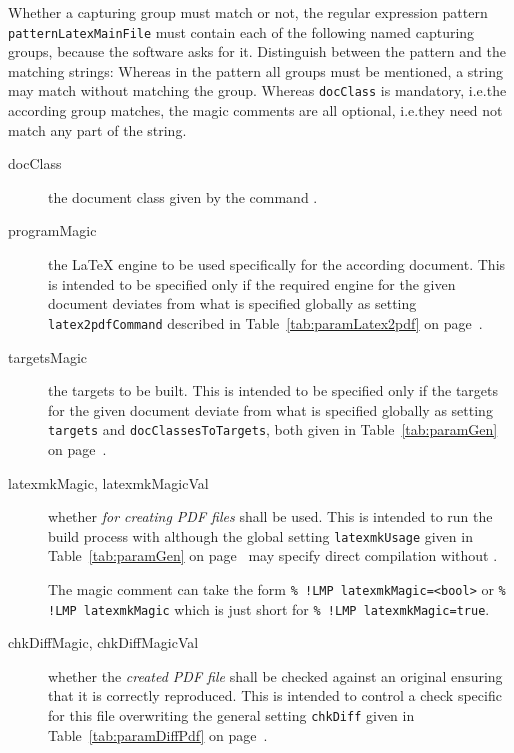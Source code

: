 Whether a capturing group must match or not, 
the regular expression pattern \texttt{patternLatexMainFile} 
must contain each of the following named capturing groups, 
because the software asks for it. 
Distinguish between the pattern and the matching strings: 
Whereas in the pattern all groups must be mentioned, 
a string may match without matching the group. 
Whereas \texttt{docClass} is mandatory, i.e.\@ the according group matches, 
the magic comments are all optional, i.e.\@ they need not match any part of the string. 

\begin{description}
  \item[docClass]
  the document class given by the command . 
  \item[programMagic]
  the \LaTeX{} engine to be used 
  specifically for the according document. 
  This is intended to be specified only 
  if the required engine for the given document deviates 
  from what is specified 
  globally as setting \texttt{latex2pdfCommand} described in 
  Table~\ref{tab:paramLatex2pdf} on page~\pageref{tab:paramLatex2pdf}. 
  \item[targetsMagic]
  the targets to be built. 
  This is intended to be specified only 
  if the targets for the given document deviate from what is specified 
  globally as setting \texttt{targets} and \texttt{docClassesToTargets}, 
  both given in 
  Table~\ref{tab:paramGen} on page~\pageref{tab:paramGen}. 
  \item[latexmkMagic, latexmkMagicVal] 
  whether \emph{for creating PDF files}  shall be used. 
  This is intended to run the build process with  
  although the global setting \texttt{latexmkUsage} 
  given in Table~\ref{tab:paramGen} on page~\pageref{tab:paramGen} 
  may specify direct compilation without . 

  The magic comment can take the form \texttt{\% !LMP latexmkMagic=<bool>} %
  or \texttt{\% !LMP latexmkMagic} %
  which is just short for \texttt{\% !LMP latexmkMagic=true}. %

  \item[chkDiffMagic, chkDiffMagicVal]
  whether the \emph{created PDF file} shall be checked against an original 
  ensuring that it is correctly reproduced. 
  This is intended to control a check specific for this file 
  overwriting the general setting \texttt{chkDiff} 
  given in Table~\ref{tab:paramDiffPdf} on page~\pageref{tab:paramDiffPdf}. 


\end{description}
